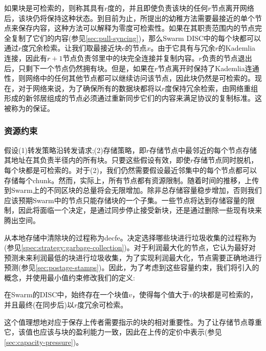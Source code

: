 如果块是可检索的，则称其具有$r$度的，并且即使负责该块的任何$r$节点离开网络后，该块仍将保持这种状态。到目前为止，所提出的幼稚方法需要最接近的单个节点来保存内容，这种方法可以解释为零度可检索性。如果在其职责范围内的节点完全复制了它们的内容(参见\ref{sec:pull-syncing})，那么Swarm DISC中的每个块都可以通过$r$度冗余检索。让我们取最接近块$c$的节点$x$。由于它具有与冗余$r$的Kademlia连接，因此有$r+1$节点负责邻里中的块完全连接并复制内容。$r$负责的节点退出后，只剩下一个节点仍然拥有块。但是，如果在$r$节点离开时保持了Kademlia连通性，则网络中的任何其他节点都可以继续访问该节点，因此块仍然是可检索的。现在，对于网络来说，为了确保所有的数据块都将以$r$度保持冗余检索，由网络重组形成的新邻居组成的节点必须通过重新同步它们的内容来满足协议的复制标准。这被称为的保证。

\subsubsection{资源约束}

假设(1)转发策略沿转发请求;(2)存储策略，即$r$存储节点中最邻近的每个节点存储其地址在其负责半径内的所有块。只要这些假设有效，即使$r$存储节点同时脱机，每个块都是可检索的。对于(2)，我们仍然需要假设最近邻集中的每个节点都可以存储每个chunk。然而，实际上，所有节点都有资源限制。随着时间的推移，上传到Swarm上的不同区块的总量将会无限增加。除非总存储容量稳步增加，否则我们应该预期Swarm中的节点只能存储块的一个子集。一些节点将达到存储容量的限制，因此将面临一个决定，是通过同步停止接受新块，还是通过删除一些现有块来腾出空间。

从本地存储中清除块的过程称为decfe。决定选择哪些块进行垃圾收集的过程称为(参见\ref{spec:strategy:garbage-collection})。对于利润最大化的节点，它认为最好对预测未来利润最低的块进行垃圾收集，为了实现利润最大化，节点需要正确地进行预测(参见\ref{sec:postage-stamps})。因此，为了考虑到这些容量约束，我们将引入的概念，并使用最小值约束修改我们的定义:

在Swarm的DISC中，始终存在一个块值$v$，使得每个值大于$v$的块都是可检索的，并且最终(在同步后)以$r$度冗余可检索。

这个值理想地对应于保存上传者需要指示的块的相对重要性。为了让存储节点尊重它，该值也应该与块的盈利能力一致，因此在上传的定价中表示(参见\ref{sec:capacity-pressure})。


